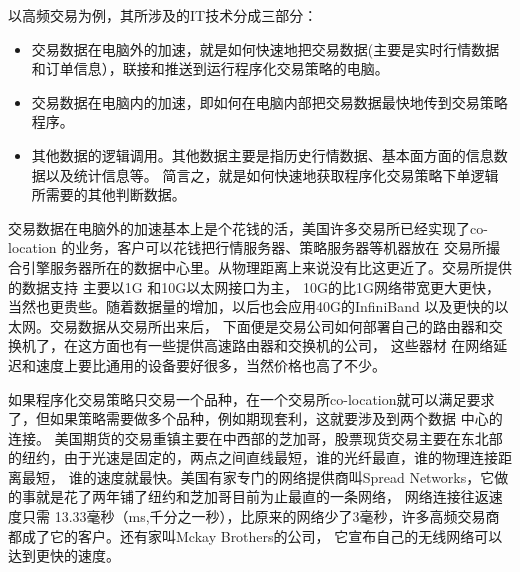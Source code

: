 以高频交易为例，其所涉及的IT技术分成三部分：
\begin{itemize}
\item 交易数据在电脑外的加速，就是如何快速地把交易数据(主要是实时行情数据和订单信息），联接和推送到运行程序化交易策略的电脑。
\item 交易数据在电脑内的加速，即如何在电脑内部把交易数据最快地传到交易策略程序。
\item 其他数据的逻辑调用。其他数据主要是指历史行情数据、基本面方面的信息数据以及统计信息等。
      简言之，就是如何快速地获取程序化交易策略下单逻辑所需要的其他判断数据。
\end{itemize}	 
交易数据在电脑外的加速基本上是个花钱的活，美国许多交易所已经实现了co-location 的业务，客户可以花钱把行情服务器、策略服务器等机器放在
交易所撮合引擎服务器所在的数据中心里。从物理距离上来说没有比这更近了。交易所提供的数据支持 主要以1G 和10G以太网接口为主，
10G的比1G网络带宽更大更快，当然也更贵些。随着数据量的增加，以后也会应用40G的InfiniBand 以及更快的以太网。交易数据从交易所出来后，
下面便是交易公司如何部署自己的路由器和交换机了，在这方面也有一些提供高速路由器和交换机的公司，
这些器材 在网络延迟和速度上要比通用的设备要好很多，当然价格也高了不少。
	  
如果程序化交易策略只交易一个品种，在一个交易所co-location就可以满足要求了，但如果策略需要做多个品种，例如期现套利，这就要涉及到两个数据 中心的连接。
美国期货的交易重镇主要在中西部的芝加哥，股票现货交易主要在东北部的纽约，由于光速是固定的，两点之间直线最短，谁的光纤最直，谁的物理连接距离最短，
谁的速度就最快。美国有家专门的网络提供商叫Spread Networks，它做的事就是花了两年铺了纽约和芝加哥目前为止最直的一条网络，
网络连接往返速度只需 13.33毫秒（ms,千分之一秒），比原来的网络少了3毫秒，许多高频交易商都成了它的客户。还有家叫Mckay Brothers的公司，
它宣布自己的无线网络可以达到更快的速度。
	   
